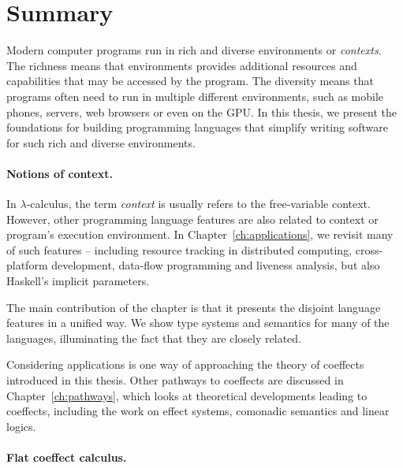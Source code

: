 \section{Summary}
\label{sec:conc-summary}

Modern computer programs run in rich and diverse environments or \emph{contexts}. The richness means 
that environments provides additional resources and capabilities that may be accessed by the program. 
The diversity means that programs often need to run in multiple different environments, such as mobile 
phones, servers, web browsers or even on the GPU. In this thesis, we present the foundations for
building programming languages that simplify writing software for such rich and diverse environments.


\paragraph{Notions of context.}

In $\lambda$-calculus, the term \emph{context} is usually refers to the free-variable context.
However, other programming language features are also related to context or program's
execution environment. In Chapter~\ref{ch:applications}, we revisit many of such features --
including resource tracking in distributed computing, cross-platform development, data-flow 
programming and liveness analysis, but also Haskell's implicit parameters. 

The main contribution of the chapter is that it presents the disjoint language features in a 
unified way. We show type systems and semantics for many of the languages, illuminating
the fact that they are closely related. 

Considering applications is one way of approaching the theory of coeffects introduced in this thesis.
Other pathways to coeffects are discussed in Chapter~\ref{ch:pathways}, which looks at theoretical 
developments leading to coeffects, including the work on effect systems, comonadic semantics and 
linear logics.


\paragraph{Flat coeffect calculus.}

